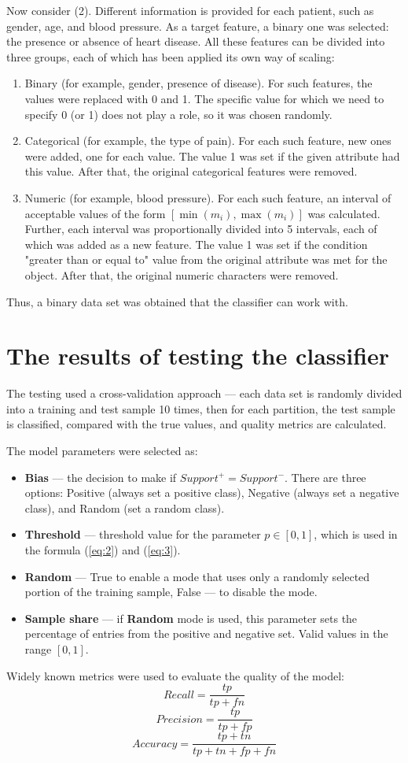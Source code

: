 \documentclass{article}
\begin{document}
Now consider (2). Different information is provided for each patient, such as gender, age, and blood pressure. As a target feature, a binary one was selected: the presence or absence of heart disease. All these features can be divided into three groups, each of which has been applied its own way of scaling:
\begin{enumerate}
    \item Binary (for example, gender, presence of disease). For such features, the values were replaced with 0 and 1. The specific value for which we need to specify 0 (or 1) does not play a role, so it was chosen randomly.
    \item Categorical (for example, the type of pain). For each such feature, new ones were added, one for each value. The value 1 was set if the given attribute had this value. After that, the original categorical features were removed.
    \item Numeric (for example, blood pressure). For each such feature, an interval of acceptable values of the form $[\min(m_i), \max(m_i)]$ was calculated. Further, each interval was proportionally divided into 5 intervals, each of which was added as a new feature. The value 1 was set if the condition "greater than or equal to" value from the original attribute was met for the object. After that, the original numeric characters were removed.
\end{enumerate}

Thus, a binary data set was obtained that the classifier can work with.

\section{The results of testing the classifier}

The testing used a cross-validation approach --- each data set is randomly divided into a training and test sample 10 times, then for each partition, the test sample is classified, compared with the true values, and quality metrics are calculated.

The model parameters were selected as:
\begin{itemize}
    \item \textbf{Bias} --- the decision to make if $Support^+ = Support^ -$. There are three options: Positive (always set a positive class), Negative (always set a negative class), and Random (set a random class).
    \item \textbf{Threshold} --- threshold value for the parameter $p \in [0, 1]$, which is used in the formula (\ref{eq:2}) and (\ref{eq:3}).
    \item \textbf{Random} --- True to enable a mode that uses only a randomly selected portion of the training sample, False --- to disable the mode.
    \item \textbf{Sample share} --- if \textbf{Random} mode is used, this parameter sets the percentage of entries from the positive and negative set. Valid values in the range $[0, 1]$.
\end{itemize}
Widely known metrics were used to evaluate the quality of the model:
$$Recall = \frac{tp}{tp+fn}$$
$$Precision = \frac{tp}{tp+fp}$$
$$Accuracy = \frac{tp + tn}{tp + tn + fp + fn}$$
\end{document}
